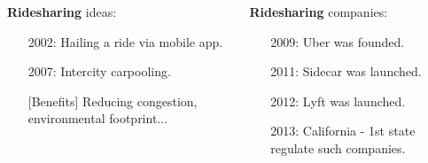 \documentclass[aspectratio=169]{beamer}
\begin{document}
\begin{frame}
\begin{columns}
\begin{column}{0.37\textwidth}
\footnotesize
\textbf{\color{light_red}Ridesharing} ideas:
\vspace{-0.3em}
\begin{itemize}
    \item[\color{gray}\textbullet] {\color{light_blue}2002}: Hailing a ride via mobile app.\vspace{-0.2em}
    \item[\color{gray}\textbullet] {\color{light_blue}2007}: Intercity carpooling.
    \item[\color{gray}\textbullet] [Benefits] Reducing congestion, environmental footprint...
\end{itemize}
\end{column}

\begin{column}{0.35\textwidth}
\footnotesize
\textbf{\color{light_red}Ridesharing} companies:
\vspace{-0.3em}
\begin{itemize}
    \item[\color{gray}\textbullet] {\color{light_blue}2009}: Uber was founded.\vspace{-0.2em}
    \item[\color{gray}\textbullet] {\color{light_blue}2011}: Sidecar was launched.\vspace{-0.2em}
    \item[\color{gray}\textbullet] {\color{light_blue}2012}: Lyft was launched.\vspace{-0.2em}
    \item[\color{gray}\textbullet] {\color{light_blue}2013}: California - 1st state regulate such companies.
\end{itemize}
\end{column}
\end{columns}

\end{frame}
\end{document}
